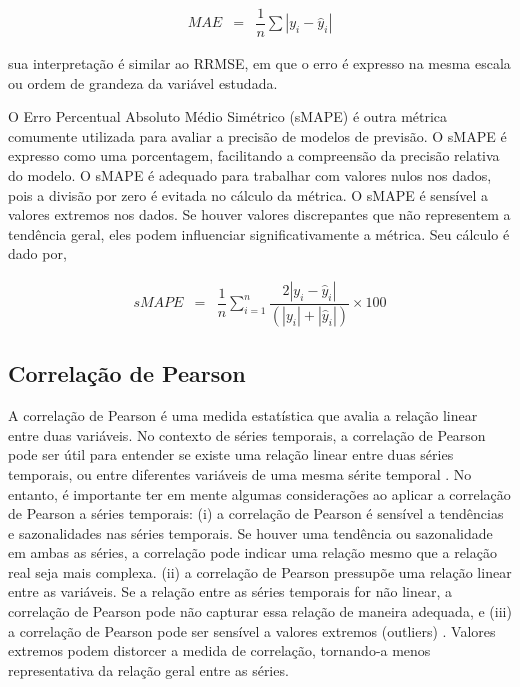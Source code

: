  \begin{eqnarray}
 	M A E &=& \dfrac{1}{n} \sum\left|y_i-\hat{y}_i\right|\label{eq:mae}
 \end{eqnarray}
 
 \noindent sua interpretação é similar ao RRMSE, em que o erro é expresso na mesma escala ou ordem de grandeza da variável estudada.
 
O Erro Percentual Absoluto Médio Simétrico (sMAPE) é outra métrica comumente utilizada para avaliar a precisão de modelos de previsão. O sMAPE é expresso como uma porcentagem, facilitando a compreensão da precisão relativa do modelo. O sMAPE é adequado para trabalhar com valores nulos nos dados, pois a divisão por zero é evitada no cálculo da métrica. O sMAPE é sensível a valores extremos nos dados. Se houver valores discrepantes que não representem a tendência geral, eles podem influenciar significativamente a métrica. Seu cálculo é dado por,
  
 \begin{eqnarray}
 	sMAPE &=& \dfrac{1}{n} \sum_{i=1}^{n} \dfrac{2|y_i - \hat{y}_i|}{(|y_i| + |\hat{y}_i|)} \times 100\label{eq:smape}
 \end{eqnarray}
 

\subsection{Correla\c c\~ao de Pearson}

A correlação de Pearson é uma medida estatística que avalia a relação linear entre duas variáveis. No contexto de séries temporais, a correlação de Pearson pode ser útil para entender se existe uma relação linear entre duas séries temporais, ou entre diferentes variáveis de uma mesma sérite temporal \cite{CESARDELIMANOGUEIRA2023128066}. No entanto, é importante ter em mente algumas considerações ao aplicar a correlação de Pearson a séries temporais: (i) a correlação de Pearson é sensível a tendências e sazonalidades nas séries temporais. Se houver uma tendência ou sazonalidade em ambas as séries, a correlação pode indicar uma relação mesmo que a relação real seja mais complexa. (ii) a correlação de Pearson pressupõe uma relação linear entre as variáveis. Se a relação entre as séries temporais for não linear, a correlação de Pearson pode não capturar essa relação de maneira adequada, e (iii) a correlação de Pearson pode ser sensível a valores extremos (outliers)
 \cite{DOSSANTOSCOELHO2024129366}. Valores extremos podem distorcer a medida de correlação, tornando-a menos representativa da relação geral entre as séries.

